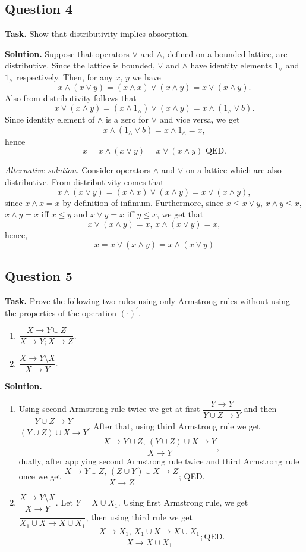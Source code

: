 \documentclass[14pt,a4paper]{extarticle}
\begin{document}
	\newpage
	\subsection*{Question 4}
	
	\noindent\textbf{Task.}  Show that distributivity implies absorption.
	
	\noindent\textbf{Solution.} Suppose that operators $\lor$ and $\land$, defined on a bounded lattice, are distributive. Since the lattice is bounded, $\lor$ and $\land$ have identity elements $1_{\lor}$ and $1_{\land}$ respectively. Then, for any $x,\, y$ we have
	\[x\land(x\lor y)= (x\land x)\lor(x\land y) = x\lor(x\land y).\]
	Also from distributivity follows that
	\[x\lor(x\land y) = (x\land 1_{\land})\lor(x\land y) = x\land (1_{\land}\lor b).\]
	Since identity element of $\land$ is a zero for $\lor$ and vice versa, we get
	\[x\land (1_{\land}\lor b) = x\land1_{\land}=x,\]
	hence
	\[x = x\land(x\lor y) = x\lor(x\land y)\text{ QED}.\]
	
	\noindent\textit{Alternative solution.} Consider operators $\land$ and $\lor$ on a lattice which are also distributive. From distributivity comes that
	\[x\land(x\lor y) = (x\land x)\lor(x\land y) = x\lor(x\land y),\]
	since $x\land x=x$ by definition of infimum. Furthermore, since $x \leq x\lor y$, $x\land y \leq x$, $x\land y = x$ iff $x\leq y$ and $x \lor y = x$ iff $y \leq x$, we get that
	\[x\lor(x\land y)=x,\, x\land(x\lor y)=x,\]
	hence,
	\[x=x\lor(x\land y)=x\land(x\lor y)\]
	\newpage
	\subsection*{Question 5}
	
	\noindent\textbf{Task.}  Prove the following two rules using only Armstrong rules without using the properties of the operation $(\cdot)^\prime$.
	\begin{enumerate}
		\item $\dfrac{X\rightarrow Y\cup Z}{X\rightarrow Y; X\rightarrow Z}$,
		\item $\dfrac{X \rightarrow Y\setminus X}{X \rightarrow Y}$.
	\end{enumerate}
	\noindent\textbf{Solution.} 
	\begin{enumerate}
		\item Using second Armstrong rule twice we get at first $\dfrac{Y\rightarrow Y}{Y\cup Z\rightarrow Y}$ and then $\dfrac{Y\cup Z\rightarrow Y}{(Y\cup Z) \cup X\rightarrow Y}$. After that, using third Armstrong rule we get 
		\[\dfrac{X\rightarrow Y\cup Z,\, (Y \cup Z) \cup X \rightarrow Y}{X\rightarrow Y},\]
		dually, after applying second Armstrong rule twice and third Armstrong rule once we get $\dfrac{X\rightarrow Y\cup Z,\, (Z \cup Y) \cup X \rightarrow Z}{X\rightarrow Z}$; QED.
		\item $\dfrac{X \rightarrow Y\setminus X}{X \rightarrow Y}$. Let $Y=X\cup X_1$. Using first Armstrong rule, we get $\dfrac{}{X_1\cup X\rightarrow X\cup X_1}$, then using third rule we get 
		\[\dfrac{X\rightarrow X_1,\, X_1\cup X\rightarrow X\cup X_1}{X\rightarrow X\cup X_1}; \text{QED}.\]
	\end{enumerate}
\end{document}
